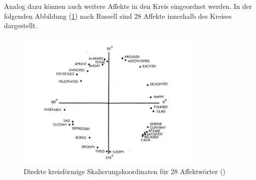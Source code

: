 \documentclass[./dokumentation.tex]{subfiles}
\begin{document}
Analog dazu können auch weitere Affekte in den Kreis eingeordnet werden. In der folgenden Abbildung (\ref{fig5:28affect}) nach Russell sind 28 Affekte innerhalb des Kreises dargestellt.

\begin{figure}[H]
    \centering
    \includegraphics[width=0.8\textwidth]{bilder/russell2.png}
    \caption{Direkte kreisförmige Skalierungskoordinaten für 28 Affektwörter (\cite{Russell1980})}
    \label{fig5:28affect}
\end{figure}\\
\end{document}
